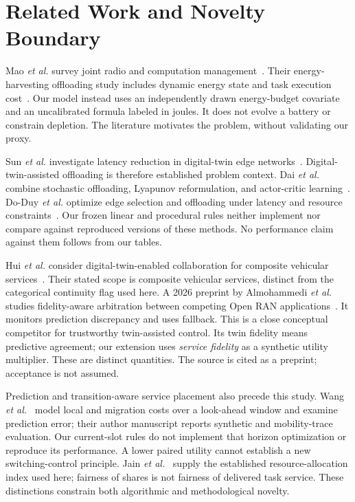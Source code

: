 \documentclass[10pt,twocolumn]{article}
\begin{document}
\section{Related Work and Novelty Boundary}
Mao \emph{et al.} survey joint radio and computation management~\cite{mao2017survey}. Their energy-harvesting offloading study includes dynamic energy state and task execution cost~\cite{mao2016dynamic}. Our model instead uses an independently drawn energy-budget covariate and an uncalibrated formula labeled in joules. It does not evolve a battery or constrain depletion. The literature motivates the problem, without validating our proxy.

Sun \emph{et al.} investigate latency reduction in digital-twin edge networks~\cite{sun2020latency}. Digital-twin-assisted offloading is therefore established problem context. Dai \emph{et al.} combine stochastic offloading, Lyapunov reformulation, and actor-critic learning~\cite{dai2021stochastic}. Do-Duy \emph{et al.} optimize edge selection and offloading under latency and resource constraints~\cite{doduy2022offloading}. Our frozen linear and procedural rules neither implement nor compare against reproduced versions of these methods. No performance claim against them follows from our tables.

Hui \emph{et al.} consider digital-twin-enabled collaboration for composite vehicular services~\cite{hui2025collaboration}. Their stated scope is composite vehicular services, distinct from the categorical continuity flag used here. A 2026 preprint by Almohammedi \emph{et al.} studies fidelity-aware arbitration between competing Open RAN applications~\cite{almohammedi2026fidelity}. It monitors prediction discrepancy and uses fallback. This is a close conceptual competitor for trustworthy twin-assisted control. Its twin fidelity means predictive agreement; our extension uses \emph{service fidelity} as a synthetic utility multiplier. These are distinct quantities. The source is cited as a preprint; acceptance is not assumed.


Prediction and transition-aware service placement also precede this study. Wang \emph{et al.}~\cite{wang2016placement} model local and migration costs over a look-ahead window and examine prediction error; their author manuscript reports synthetic and mobility-trace evaluation. Our current-slot rules do not implement that horizon optimization or reproduce its performance. A lower paired utility cannot establish a new switching-control principle. Jain \emph{et al.}~\cite{jain1984fairness} supply the established resource-allocation index used here; fairness of shares is not fairness of delivered task service. These distinctions constrain both algorithmic and methodological novelty.
\end{document}
